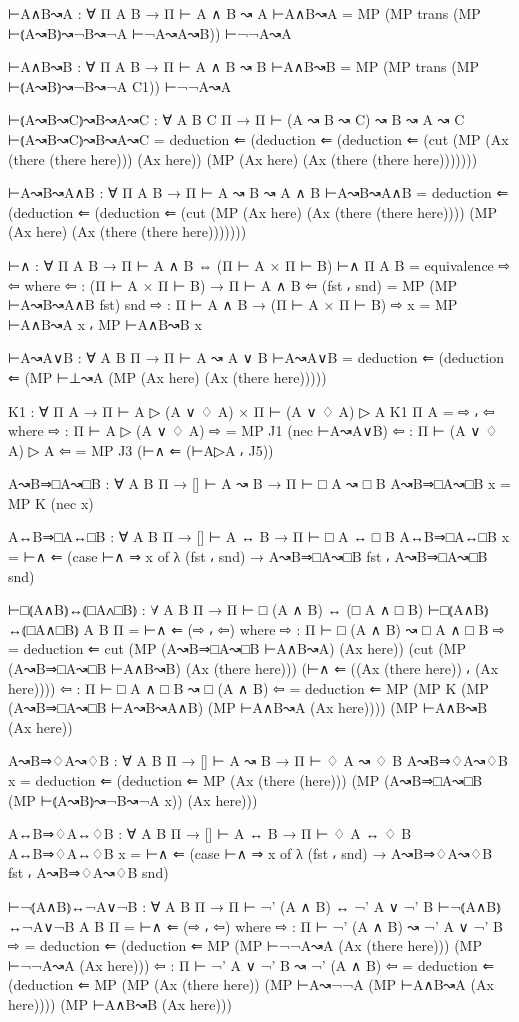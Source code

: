 \begin{spverbatim}
⊢A∧B↝A : ∀ {Π A B} → Π ⊢ A ∧ B ↝ A
⊢A∧B↝A = MP (MP trans (MP ⊢⦅A↝B⦆↝¬B↝¬A ⊢¬A↝A↝B)) ⊢¬¬A↝A

⊢A∧B↝B : ∀ {Π A B} → Π ⊢ A ∧ B ↝ B
⊢A∧B↝B = MP (MP trans (MP ⊢⦅A↝B⦆↝¬B↝¬A C1)) ⊢¬¬A↝A

⊢⦅A↝B↝C⦆↝B↝A↝C : ∀ {A B C Π} → Π ⊢ (A ↝ B ↝ C) ↝ B ↝ A ↝ C
⊢⦅A↝B↝C⦆↝B↝A↝C = deduction ⇐ (deduction ⇐ (deduction ⇐ (cut
  (MP (Ax (there (there here))) (Ax here)) (MP (Ax here)
  (Ax (there (there here)))))))

⊢A↝B↝A∧B : ∀ {Π A B} → Π ⊢ A ↝ B ↝ A ∧ B
⊢A↝B↝A∧B = deduction ⇐ (deduction ⇐ (deduction ⇐ (cut (MP (Ax here)
  (Ax (there (there here)))) (MP (Ax here)
  (Ax (there (there here)))))))

⊢∧ : ∀ {Π A B} → Π ⊢ A ∧ B ⇔ (Π ⊢ A × Π ⊢ B)
⊢∧ {Π} {A} {B} = equivalence ⇨ ⇦
  where
  ⇦ : (Π ⊢ A × Π ⊢ B) → Π ⊢ A ∧ B
  ⇦ (fst ⸴ snd) = MP (MP ⊢A↝B↝A∧B fst) snd
  ⇨ : Π ⊢ A ∧ B → (Π ⊢ A × Π ⊢ B)
  ⇨ x = MP ⊢A∧B↝A x ⸴ MP ⊢A∧B↝B x

⊢A↝A∨B : ∀ {A B Π} → Π ⊢ A ↝ A ∨ B
⊢A↝A∨B = deduction ⇐ (deduction ⇐ (MP ⊢⊥↝A (MP (Ax here)
  (Ax (there here)))))

K1 : ∀ {Π A} → Π ⊢ A ▷ (A ∨ ♢ A) × Π ⊢ (A ∨ ♢ A) ▷ A
K1 {Π} {A} = ⇨ ⸴ ⇦
  where
  ⇨ : Π ⊢ A ▷ (A ∨ ♢ A)
  ⇨ = MP J1 (nec ⊢A↝A∨B)
  ⇦ : Π ⊢ (A ∨ ♢ A) ▷ A
  ⇦ = MP J3 (⊢∧ ⇐ (⊢A▷A ⸴ J5))

A↝B⇒□A↝□B : ∀ {A B Π} → [] ⊢ A ↝ B → Π ⊢ □ A ↝ □ B
A↝B⇒□A↝□B x = MP K (nec x)

A↔B⇒□A↔□B : ∀ {A B Π} → [] ⊢ A ↔ B → Π ⊢ □ A ↔ □ B
A↔B⇒□A↔□B x = ⊢∧ ⇐ (case ⊢∧ ⇒ x of λ {(fst ⸴ snd) → A↝B⇒□A↝□B fst ⸴ A↝B⇒□A↝□B snd})

⊢□⦅A∧B⦆↔⦅□A∧□B⦆ : ∀ {A B Π} → Π ⊢ □ (A ∧ B) ↔ (□ A ∧ □ B)
⊢□⦅A∧B⦆↔⦅□A∧□B⦆ {A} {B} {Π} = ⊢∧ ⇐ (⇨ ⸴ ⇦)
  where
  ⇨ : Π ⊢ □ (A ∧ B) ↝ □ A ∧ □ B
  ⇨ = deduction ⇐ cut (MP (A↝B⇒□A↝□B ⊢A∧B↝A) (Ax here))
    (cut (MP (A↝B⇒□A↝□B ⊢A∧B↝B) (Ax (there here)))
   (⊢∧ ⇐ ((Ax (there here)) ⸴ (Ax here))))
  ⇦ : Π ⊢ □ A ∧ □ B ↝ □ (A ∧ B)
  ⇦ = deduction ⇐ MP (MP K (MP (A↝B⇒□A↝□B  ⊢A↝B↝A∧B) (MP ⊢A∧B↝A (Ax here))))
    (MP ⊢A∧B↝B (Ax here))

A↝B⇒♢A↝♢B : ∀ {A B Π} → [] ⊢ A ↝ B → Π ⊢ ♢ A ↝ ♢ B
A↝B⇒♢A↝♢B x = deduction ⇐ (deduction ⇐
  MP (Ax (there (here))) (MP (A↝B⇒□A↝□B (MP ⊢⦅A↝B⦆↝¬B↝¬A x)) (Ax here)))

A↔B⇒♢A↔♢B : ∀ {A B Π} → [] ⊢ A ↔ B → Π ⊢ ♢ A ↔ ♢ B
A↔B⇒♢A↔♢B x = ⊢∧ ⇐ (case ⊢∧ ⇒ x of λ {(fst ⸴ snd) → A↝B⇒♢A↝♢B fst ⸴ A↝B⇒♢A↝♢B snd})

⊢¬⦅A∧B⦆↔¬A∨¬B : ∀ {A B Π} → Π ⊢ ¬' (A ∧ B) ↔ ¬' A ∨ ¬' B
⊢¬⦅A∧B⦆↔¬A∨¬B {A} {B} {Π} = ⊢∧ ⇐ (⇨ ⸴ ⇦)
  where
  ⇨ : Π ⊢ ¬' (A ∧ B) ↝ ¬' A ∨ ¬' B
  ⇨ = deduction ⇐ (deduction ⇐  MP (MP ⊢¬¬A↝A (Ax (there here)))
    (MP ⊢¬¬A↝A (Ax here)))
  ⇦ : Π ⊢ ¬' A ∨ ¬' B ↝ ¬' (A ∧ B)
  ⇦ = deduction ⇐ (deduction ⇐ MP (MP (Ax (there here))
   (MP ⊢A↝¬¬A (MP ⊢A∧B↝A (Ax here)))) (MP ⊢A∧B↝B (Ax here)))


\end{spverbatim}
